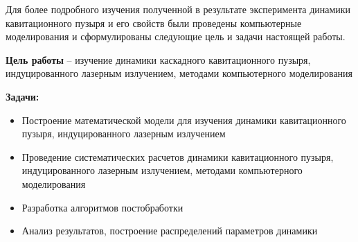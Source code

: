 Для более подробного изучения полученной в результате эксперимента динамики кавитационного пузыря и его свойств были проведены компьютерные моделирования и сформулированы следующие цель и задачи настоящей работы.

\textbf{Цель работы} -- изучение динамики каскадного кавитационного пузыря, индуцированного лазерным излучением, методами компьютерного моделирования

\textbf{Задачи:}
\begin{itemize}
    \item Построение математической модели для изучения динамики кавитационного пузыря, индуцированного лазерным излучением
    \item Проведение систематических расчетов динамики кавитационного пузыря, индуцированного лазерным излучением, методами компьютерного моделирования
    \item Разработка алгоритмов постобработки
    \item Анализ результатов, построение распределений параметров динамики
\end{itemize}